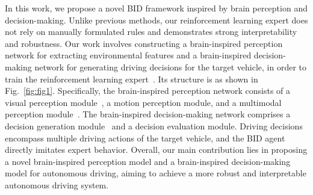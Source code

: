 In this work, we propose a novel BID framework inspired by brain perception and decision-making. 
Unlike previous methods, our reinforcement learning expert does not rely on manually formulated rules and demonstrates strong interpretability and robustness. 
Our work involves constructing a brain-inspired perception network for extracting environmental features and a brain-inspired decision-making network for generating driving decisions for the target vehicle, in order to train the reinforcement learning expert~\cite{kahn2021land}. 
Its structure is as shown in Fig.~\ref{fig:fig1}. 
Specifically, the brain-inspired perception network consists of a visual perception module~\cite{al2018brain}, a motion perception module, and a multimodal perception module~\cite{yu2023brain}. 
The brain-inspired decision-making network comprises a decision generation module~\cite{schirner2023learning} and a decision evaluation module. 
Driving decisions encompass multiple driving actions of the target vehicle, and the BID agent directly imitates expert behavior. 
Overall, our main contribution lies in proposing a novel brain-inspired perception model and a brain-inspired decision-making model for autonomous driving, aiming to achieve a more robust and interpretable autonomous driving system.





